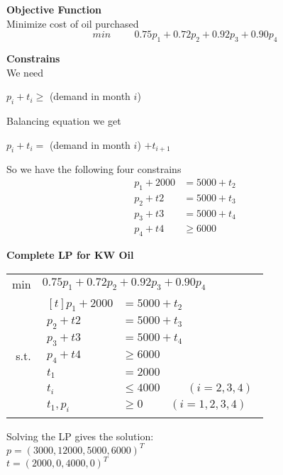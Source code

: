 \documentclass[letterpaper, 12pt]{article}
\begin{document}
{    {\large\textbf{Objective Function}}\\
    Minimize cost of oil purchased
    $$min\hspace{1cm} 0.75p_1 + 0.72p_2 + 0.92p_3 + 0.90p_4$$

    {\large\textbf{Constrains}}\\
    We need 
    \begin{center}
        $p_i + t_i \geq$ (demand in month $i$)\\
    \end{center}
    Balancing equation we get
    \begin{center}
        $p_i + t_i = $ (demand in month $i$) $ + t_{i+1}$\\
    \end{center}

    So we have the following four constrains
    \begin{align*}
        p_1 + 2000 & = 5000 + t_2\\
        p_2 + t2 & =  5000 + t_3\\
        p_3 + t3 & =  5000 + t_4\\
        p_4 + t4 & \geq  6000
    \end{align*}

    {\large\textbf{Complete LP for KW Oil}}\\
    \bigskip
    \begin{tabular}{rl}
        min & $0.75p_1 + 0.72p_2 + 0.92p_3 + 0.90p_4$\\
        s.t. & {$\begin{aligned}[t]
            p_1 + 2000 & = 5000 + t_2\\
            p_2 + t2 & =  5000 + t_3\\
            p_3 + t3 & =  5000 + t_4\\
            p_4 + t4 & \geq  6000\\
            t_1 &= 2000\\
            t_i &\leq 4000 \hspace{1cm} (i=2, 3, 4)\\
            t_1, p_i &\geq 0 \hspace{1cm} (i=1, 2, 3, 4) \end{aligned}$}
    \end{tabular}
    \bigskip
    
    Solving the LP gives the solution:\\
    $p = (3000,12000,5000,6000)^T$\\
    $t = (2000, 0, 4000, 0)^T$

}
\end{document}
